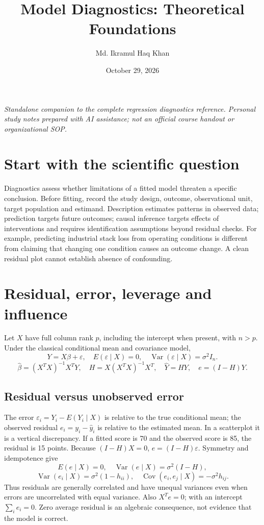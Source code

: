 \documentclass[11pt]{article}
\title{Model Diagnostics: Theoretical Foundations}
\author{Md. Ikramul Haq Khan}
\date{October 29, 2026}
\begin{document}
\maketitle
\textit{Standalone companion to the complete regression diagnostics reference. Personal study notes prepared with AI assistance; not an official course handout or organizational SOP.}
\section{Start with the scientific question}
Diagnostics assess whether limitations of a fitted model threaten a specific conclusion. Before fitting, record the study design, outcome, observational unit, target population and estimand. Description estimates patterns in observed data; prediction targets future outcomes; causal inference targets effects of interventions and requires identification assumptions beyond residual checks.
For example, predicting industrial stack loss from operating conditions is different from claiming that changing one condition causes an outcome change. A clean residual plot cannot establish absence of confounding.

\section{Residual, error, leverage and influence}
Let $X$ have full column rank $p$, including the intercept when present, with $n>p$. Under the classical conditional mean and covariance model,
\[Y=X\beta+\varepsilon,\quad E(\varepsilon\mid X)=0,\quad\operatorname{Var}(\varepsilon\mid X)=\sigma^2I_n.\]
\[\widehat\beta=(X^TX)^{-1}X^TY,\quad H=X(X^TX)^{-1}X^T,\quad \widehat Y=HY,\quad e=(I-H)Y.\]
\subsection{Residual versus unobserved error}
The error $\varepsilon_i=Y_i-E(Y_i\mid X)$ is relative to the true conditional mean; the observed residual $e_i=y_i-\widehat y_i$ is relative to the estimated mean. In a scatterplot it is a vertical discrepancy. If a fitted score is 70 and the observed score is 85, the residual is 15 points.
Because $(I-H)X=0$, $e=(I-H)\varepsilon$. Symmetry and idempotence give
\[E(e\mid X)=0,\quad\operatorname{Var}(e\mid X)=\sigma^2(I-H),\]
\[\operatorname{Var}(e_i\mid X)=\sigma^2(1-h_{ii}),\quad\operatorname{Cov}(e_i,e_j\mid X)=-\sigma^2h_{ij}.\]
Thus residuals are generally correlated and have unequal variances even when errors are uncorrelated with equal variance. Also $X^Te=0$; with an intercept $\sum_i e_i=0$. Zero average residual is an algebraic consequence, not evidence that the model is correct.
\end{document}
